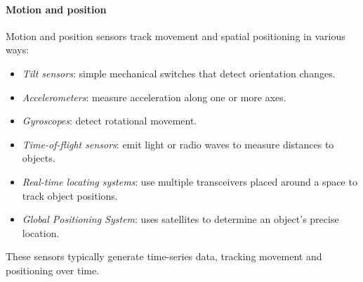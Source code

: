 \paragraph*{Motion and position}
Motion and position sensors track movement and spatial positioning in various ways:
\begin{itemize}
    \item \textit{Tilt sensors}: simple mechanical switches that detect orientation changes.
    \item \textit{Accelerometers}: measure acceleration along one or more axes.
    \item \textit{Gyroscopes}: detect rotational movement.
    \item \textit{Time-of-flight sensors}: emit light or radio waves to measure distances to objects.
    \item \textit{Real-time locating systems}: use multiple transceivers placed around a space to track object positions.
    \item \textit{Global Positioning System}: uses satellites to determine an object's precise location.
\end{itemize}
\noindent  These sensors typically generate time-series data, tracking movement and positioning over time.
